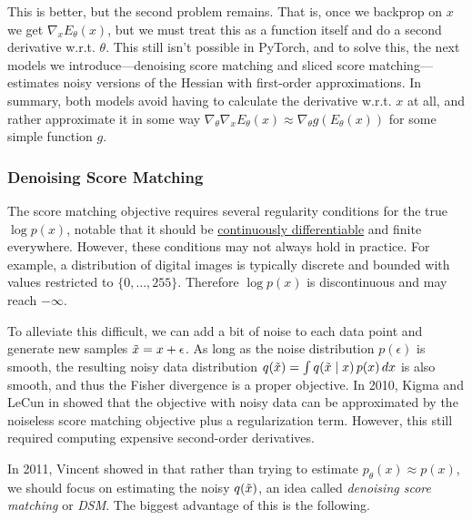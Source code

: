 \documentclass{article}
\begin{document}
    This is better, but the second problem remains. That is, once we backprop on $x$ we get $\nabla_x E_\theta (x)$, but we must treat this as a function itself and do a second derivative w.r.t. $\theta$. This still isn't possible in PyTorch, and to solve this, the next models we introduce---denoising score matching and sliced score matching---estimates noisy versions of the Hessian with first-order approximations. In summary, both models avoid having to calculate the derivative w.r.t. $x$ at all, and rather approximate it in some way $\nabla_\theta \nabla_x E_\theta (x) \approx \nabla_\theta g(E_\theta(x))$ for some simple function $g$. 

  \subsubsection{Denoising Score Matching} 

    The score matching objective requires several regularity conditions for the true $\log p(x)$, notable that it should be \hyperref[mv-def:continuously-differentiable]{continuously differentiable} and finite everywhere. However, these conditions may not always hold in practice. For example, a distribution of digital images is typically discrete and bounded with values restricted to $\{0, \ldots, 255\}$. Therefore $\log p(x)$ is discontinuous and may reach $-\infty$. 

    To alleviate this difficult, we can add a bit of noise to each data point and generate new samples $\Tilde{x} = x + \epsilon$. As long as the noise distribution $p(\epsilon)$ is smooth, the resulting noisy data distribution $q(\Tilde{x}) = \int q(\Tilde{x} \mid x) \, p(x) \,dx$ is also smooth, and thus the Fisher divergence is a proper objective. In 2010, Kigma and LeCun in \cite{reg_score} showed that the objective with noisy data can be approximated by the noiseless score matching objective plus a regularization term. However, this still required computing expensive second-order derivatives. 

    In 2011, Vincent showed in \cite{denoise_score} that rather than trying to estimate $p_\theta (x) \approx p(x)$, we should focus on estimating the noisy $q(\Tilde{x})$, an idea called \textit{denoising score matching} or \textit{DSM}. The biggest advantage of this is the following. 
\end{document}
